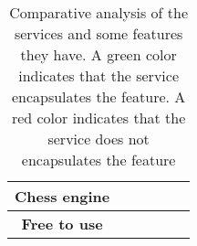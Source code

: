 \begin{table}[h]
{\begin{tabular}{clllll}
            \rowcolor[HTML]{FD6864}
            \cellcolor[HTML]{EFEFEF}\textbf{Chess engine}                            & \multicolumn{1}{l}{\cellcolor[HTML]{67FD9A}}                   & \multicolumn{1}{l}{\cellcolor[HTML]{67FD9A}}                     & \multicolumn{1}{l}{\cellcolor[HTML]{FD6864}}                   & \multicolumn{1}{l}{\cellcolor[HTML]{FD6864}}                        &                                                                    \\ \midrule
            \rowcolor[HTML]{67FD9A}
            \cellcolor[HTML]{EFEFEF}\textbf{Free to use}                             & \multicolumn{1}{l}{\cellcolor[HTML]{67FD9A}}                   & \multicolumn{1}{l}{\cellcolor[HTML]{67FD9A}}                     & \multicolumn{1}{l}{\cellcolor[HTML]{67FD9A}}                   & \multicolumn{1}{l}{\cellcolor[HTML]{FD6864}}                        &                                                                    \\ \bottomrule
        \end{tabular}%
    }
    \caption{Comparative analysis of the services and some features they have.
    A green color indicates that the service encapsulates the feature.
    A red color indicates that the service does not encapsulates the feature}\label{tab:comparative-analysis}
\end{table}
